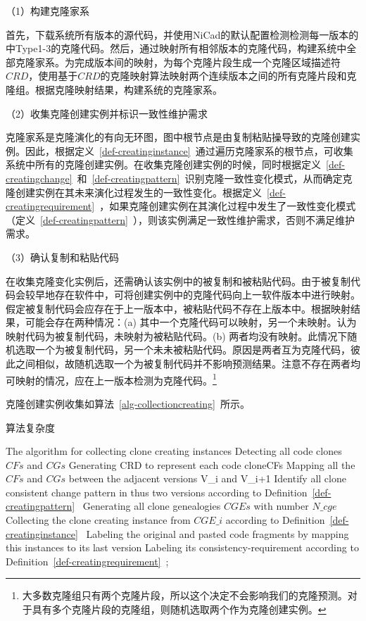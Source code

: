（1）构建克隆家系

首先，下载系统所有版本的源代码，并使用NiCad的默认配置检测检测每一版本的中Type1-3的克隆代码。然后，通过映射所有相邻版本的克隆代码，构建系统中全部克隆家系。为完成版本间的映射，为每个克隆片段生成一个克隆区域描述符 $CRD$\cite{duala2010clone}，使用基于$CRD$的克隆映射算法映射两个连续版本之间的所有克隆片段和克隆组\cite{ci2013new}\cite{ci2013newD}。根据克隆映射结果，构建系统的克隆家系。

（2）收集克隆创建实例并标识一致性维护需求

克隆家系是克隆演化的有向无环图，图中根节点是由复制粘贴操导致的克隆创建实例。因此，根据定义~\ref{def-creatinginstance}~通过遍历克隆家系的根节点，可收集系统中所有的克隆创建实例。在收集克隆创建实例的时候，同时根据定义~\ref{def-creatingchange}~和~\ref{def-creatingpattern}~识别克隆一致性变化模式，从而确定克隆创建实例在其未来演化过程发生的一致性变化。根据定义~\ref{def-creatingrequirement}~，如果克隆创建实例在其演化过程中发生了一致性变化模式（定义~\ref{def-creatingpattern}~），则该实例满足一致性维护需求，否则不满足维护需求。

（3）确认复制和粘贴代码

在收集克隆变化实例后，还需确认该实例中的被复制和被粘贴代码。由于被复制代码会较早地存在软件中，可将创建实例中的克隆代码向上一软件版本中进行映射。假定被复制代码会应存在于上一版本中，被粘贴代码不存在上版本中。根据映射结果，可能会存在两种情况：(a) 其中一个克隆代码可以映射，另一个未映射。认为映射代码为被复制代码，未映射为被粘贴代码。(b) 两者均没有映射。此情况下随机选取一个为被复制代码，另一个未未被粘贴代码。原因是两者互为克隆代码，彼此之间相似，故随机选取一个为被复制代码并不影响预测结果。注意不存在两者均可映射的情况，应在上一版本检测为克隆代码。\footnote{大多数克隆组只有两个克隆片段，所以这个决定不会影响我们的克隆预测。对于具有多个克隆片段的克隆组，则随机选取两个作为克隆创建实例。}

克隆创建实例收集如算法~\ref{alg-collectioncreating}~所示。

算法复杂度

\begin{minipage}{0.8\textwidth}
\centering
\begin{algorithm}[H]
 {The algorithm for collecting clone creating instances}
\label{alg-collectioncreating}
{
 Detecting all code clones $CFs$ and $CGs$\;
}
{ 
 Generating CRD to represent each code clone{CFs}\;
 Mapping all the $CFs$ and $CGs$ between the adjacent versions {V\_i} and {V\_{i+1}}\;
 Identify all clone consistent change pattern in thus two versions according to Definition~\ref{def-creatingpattern}~\;
}
Generating all clone genealogies $CGEs$ with number $N\_cge$\;
{ 
 Collecting the clone creating instance from $CGE\_i$ according to Definition~\ref{def-creatinginstance}~\; 
 Labeling the original and pasted code fragments by mapping this instances to its last version\;
 Labeling its consistency-requirement according to Definition~\ref{def-creatingrequirement}~;
}
\end{algorithm}
\end{minipage}

